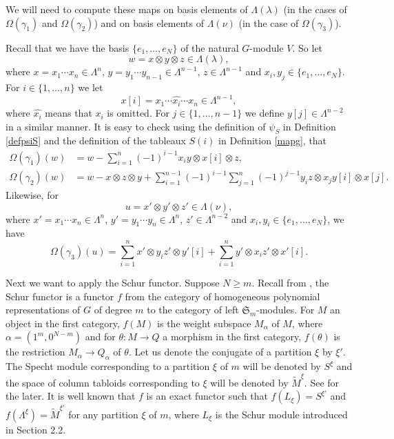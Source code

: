 \documentclass[11pt]{amsart}
\theoremstyle{definition}
\numberwithin{equation}{section}
\begin{document}
We will need to compute these maps on basis elements of $\Lambda(\lambda)$ (in the cases of $\Omega(\gamma_1)$ and $\Omega(\gamma_2)$) and on basis elements of $\Lambda(\nu)$ (in the case of $\Omega(\gamma_3)$). 

Recall that we have the basis $ \{ e_1, \dots, e_N \} $ of the natural $G$-module $V$. So let \[w=x \otimes y \otimes z \in \Lambda(\lambda),\] where $x=x_1 \cdots x_n \in \Lambda^{n}$, $y=y_1 \cdots y_{n-1} \in \Lambda^{n-1}$, $z \in \Lambda^{n-1}$ and $x_i, y_j \in \{e_1, \dots, e_N\}$. For $i \in \{1, \dots, n\}$ we let \[x[i] = x_1 \cdots \widehat{x_i} \cdots x_n \in \Lambda^{n-1},\] where  $\widehat{x_i}$ means that $x_i$ is omitted. For $j \in \{1, \dots, n-1\}$ we define $y[j] \in \Lambda ^{n-2}$ in a similar manner. It is easy to check using the definition of $\psi_S$ in Definition \ref{defpsiS} and the definition of the tableaux $S(i)$ in Definition \ref{mapg}, that 
\begin{align}\label{omegagamma}
	\Omega(\gamma_1)(w)&=w-\sum_{i=1}^n(-1)^{i-1}x_iy \otimes x[i] \otimes z,\\\label{omegaphi}
	\Omega(\gamma_2)(w)&=w-x\otimes z \otimes y+\sum_{i=1}^{n-1}(-1)^{i-1}\sum_{j=1}^n(-1)^{j-1}y_iz\otimes x_jy[i] \otimes x[j].
\end{align}
Likewise, for \[u=x' \otimes y' \otimes z' \in \Lambda(\nu),\] where $x'=x_1 \cdots x_n \in \Lambda ^{n}$, $y'= y_1 \cdots y_n \in \Lambda^ {n}$, $z' \in \Lambda^{n-2}$  and $x_i, y_i \in \{e_1, \dots, e_N\}$, we have \begin{equation}\label{omegagamma3}
\Omega(\gamma_3)(u)=\sum_{i=1}^{n} x' \otimes y_i z' \otimes y'[i] + \sum_{i=1}^{n} y' \otimes x_i z' \otimes x'[i].
\end{equation}

Next we want to apply the Schur functor. Suppose $N \ge m$. Recall from \cite{Gr}, the Schur functor is a functor $f$ from the category of homogeneous polynomial representations of  $G$ of degree $m$ to the category of left $\mathfrak{S}_m$-modules. For $M$ an object in the first category,  $f(M)$ is the weight subspace $M_\alpha$ of $M$, where $\alpha = (1^m, 0^{N-m})$ and for $\theta :M \to Q$ a morphism in the first category, $f(\theta)$  is the restriction $M_\alpha \to Q_\alpha$ of $\theta$. Let us denote the conjugate of a partition $\xi$ by $\xi'$. The Specht module corresponding to a partition $\xi$ of $m$ will be denoted by $S^{\xi}$ and the space of column tabloids corresponding to $\xi$ will be denoted by ${\tilde{M}}^\xi$. See \cite[Chapter 7.4]{F} for the later. It is well known that $f$ is an exact functor such that $f(L_{\xi})=S^{\xi'}$ and $f(\Lambda^{\xi}) = \tilde{M}^{\xi'}$ for any partition $\xi$ of $m$, where $L_{\xi}$ is the Schur module introduced in Section 2.2.
\end{document}
